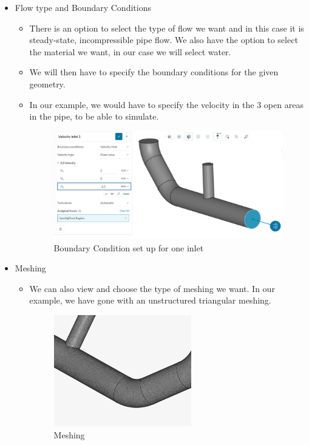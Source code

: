 \documentclass[12pt]{article}
\begin{document}
\begin{itemize}
\begin{itemize}
\end{itemize}
    \item Flow type and Boundary Conditions
    \begin{itemize}
        \item There is an option to select the type of flow we want and in this case it is steady-state, incompressible pipe flow. We also have the option to select the material we want, in our case we will select water.
        \item We will then have to specify the boundary conditions for the given geometry.
        \item In our example, we would have to specify the velocity in the 3 open areas in the pipe, to be able to simulate.
        \begin{figure}[hbt!]
  \centering
  \includegraphics[width=10cm]{plot5.jpg}
  \caption{Boundary Condition set up for one inlet\label{fig:fig1}}
\end{figure}
    \end{itemize}
    \item Meshing
    \begin{itemize}
        \item We can also view and choose the type of meshing we want. In our example, we have gone with an unstructured triangular meshing.
        \begin{figure}[hbt!]
  \centering
  \includegraphics[width=6cm]{plot99.png}
  \caption{Meshing\label{fig:fig1}}
\end{figure}
        

\end{itemize}
\end{itemize}
\end{document}
